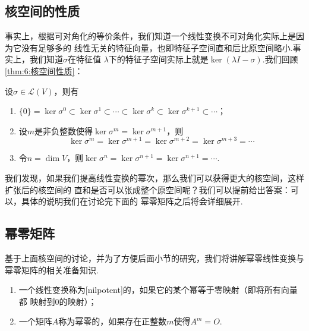 \subsection{核空间的性质}
事实上，根据可对角化的等价条件，我们知道一个线性变换不可对角化实际上是因为它没有足够多的
线性无关的特征向量，也即特征子空间直和后比原空间略小.事实上，我们知道$\sigma$在特征值
$\lambda$下的特征子空间实际上就是$\ker(\lambda I-\sigma)$.我们回顾\autoref{thm:6:核空间性质}：
\begin{theorem}\label{thm:19:核空间性质}
    设$\sigma\in \mathcal{L}(V)$，则有
    \begin{enumerate}
        \item $\{0\}=\ker \sigma^0\subset\ker \sigma^1\subset\cdots\subset
        \ker \sigma^k\subset\ker \sigma^{k+1}\subset\cdots$；

        \item 设$m$是非负整数使得$\ker \sigma^m=\ker \sigma^{m+1}$，则
        \[\ker \sigma^m=\ker \sigma^{m+1}=\ker \sigma^{m+2}=\ker \sigma^{m+3}=\cdots\]

        \item 令$n=\dim V$，则$\ker \sigma^n=\ker \sigma^{n+1}=\ker \sigma^{n+1}=\cdots$.
    \end{enumerate}
\end{theorem}

我们发现，如果我们提高线性变换的幂次，那么我们可以获得更大的核空间，这样扩张后的核空间的
直和是否可以张成整个原空间呢？我们可以提前给出答案：可以，具体的说明我们在讨论完下面的
幂零矩阵之后将会详细展开.

\subsection{幂零矩阵}
基于上面核空间的讨论，并为了方便后面小节的研究，我们将讲解幂零线性变换与幂零矩阵的相关准备知识.
\begin{definition}
    \begin{enumerate}
        \item 一个线性变换称为[nilpotent]的，如果它的某个幂等于零映射（即将所有向量都
        映射到0的映射）；
        \item 一个矩阵$A$称为幂零的，如果存在正整数$m$使得$A^m=O$.
    \end{enumerate}
\end{definition}

